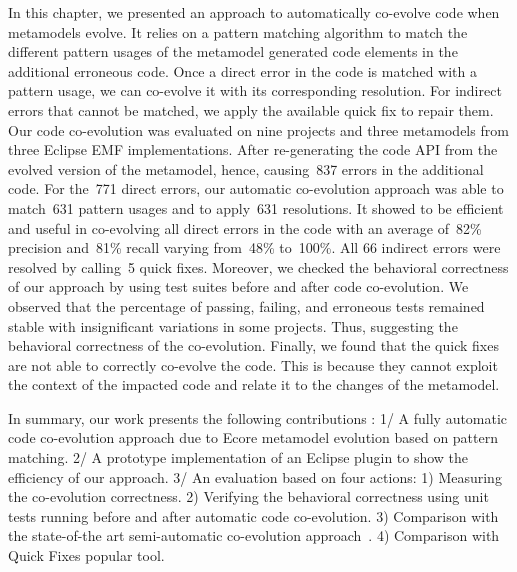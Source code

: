 In this chapter, we presented an approach to automatically co-evolve code when metamodels evolve. It relies on a pattern matching algorithm to match the different pattern usages of the metamodel generated code elements in the additional erroneous code. Once a direct error in the code is matched with a pattern usage, we can co-evolve it with its corresponding resolution. 
For indirect errors that cannot be matched, we apply the available quick fix to repair them. 
%
Our code co-evolution was evaluated on nine projects and three metamodels from three Eclipse EMF implementations. After re-generating the code API from the evolved version of the metamodel, hence, causing~837 errors in the additional code.
For the~771 direct errors, our automatic co-evolution approach was able to match~631 pattern usages and to apply~631 resolutions. It showed to be efficient and useful in co-evolving all direct errors in the code with an average of~82\% precision and~81\% recall varying from~48\% to~100\%. All 66 indirect errors were resolved by calling~5 quick fixes. Moreover, we checked the behavioral correctness of our approach by using test suites before and after code co-evolution. We observed that the percentage of passing, failing, and erroneous tests remained stable with insignificant variations in some projects. Thus, suggesting the behavioral correctness of the co-evolution. Finally, we found that the quick fixes are not able to correctly co-evolve the code. This is because they cannot exploit the context of the impacted code and relate it to the changes of the metamodel. 


In summary, our work presents the following contributions :
1/ A fully automatic code co-evolution approach due to Ecore metamodel evolution based on pattern matching. 
2/ A prototype implementation of an Eclipse plugin to show the efficiency of our approach. %
3/ An evaluation based on four actions: 1) Measuring the co-evolution correctness. 2) Verifying the behavioral correctness using unit tests running before and after automatic code co-evolution. 3) Comparison with the state-of-the art semi-automatic co-evolution approach~\cite{Khelladi2020}. 4) Comparison with Quick Fixes popular tool.


